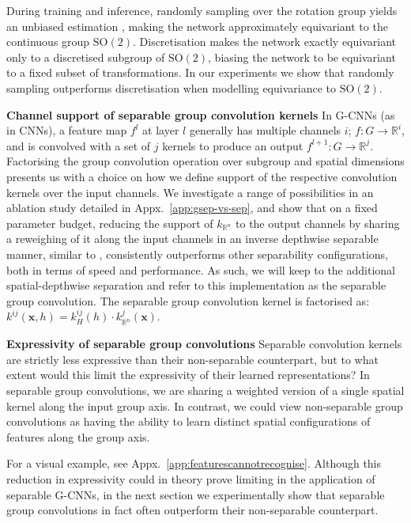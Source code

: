 \documentclass[nohyperref]{article}
\theoremstyle{plain}
\theoremstyle{definition}
\theoremstyle{remark}
\newcommand{\R}{\mathbb{R}}
\begin{document}
During training and inference, randomly sampling over the rotation group yields an unbiased estimation \citep{wu2019pointconv}, making the network approximately equivariant to the continuous group $\mathrm{SO(2)}$. Discretisation makes the network exactly equivariant only to a discretised subgroup of $\mathrm{SO(2)}$, biasing the network to be equivariant to a fixed subset of transformations. In our experiments we show that randomly sampling outperforms discretisation when modelling equivariance to $\mathrm{SO(2)}$.



\textbf{Channel support of separable group convolution kernels} \label{sec:depthwisesep}In G-CNNs (as in CNNs), a feature map $f^l$ at layer $l$ generally has multiple channels  $i$; $f:G \rightarrow \R^{i}$, and is convolved with a set of $j$ kernels to produce an output $f^{l+1}:G \rightarrow \R^{j}$. Factorising the group convolution operation over subgroup and spatial dimensions presents us with a choice on how we define support of the respective convolution kernels over the input channels. We investigate a range of possibilities in an ablation study detailed in Appx.~\ref{app:gsep-vs-sep}, and show that on a fixed parameter budget, reducing the support of $k_{\mathbb{R}^n}$ to the output channels by sharing a reweighing of it along the input channels in an inverse depthwise separable manner, similar to \citet{haase2020rethinking}, consistently outperforms other separability configurations, both in terms of speed and performance. As such, we will keep to the additional spatial-depthwise separation and refer to this implementation as the separable group convolution. The separable group convolution kernel is factorised as: $k^{ij}(\boldsymbol{x},h)=k_H^{ij}(h)\cdot k^j_{\mathbb{R}^n}(\boldsymbol{x})$.

\textbf{Expressivity of separable group convolutions} Separable convolution kernels are strictly less expressive than their non-separable counterpart, but to what extent would this limit the expressivity of their learned representations? In separable group convolutions, we are sharing a weighted version of a single spatial kernel along the input group axis. In contrast, we could view non-separable group convolutions as having the ability to learn distinct spatial configurations of features along the group axis. 

For a visual example, see Appx.~\ref{app:featurescannotrecognise}. Although this reduction in expressivity could in theory prove limiting in the application of separable G-CNNs, in the next section we experimentally show that separable group convolutions in fact often outperform their non-separable counterpart.
\end{document}
